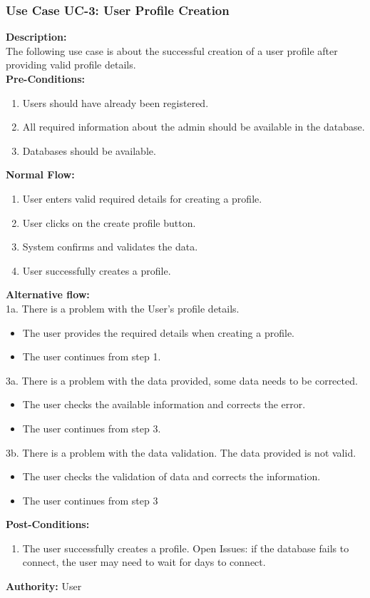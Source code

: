 \subsubsection{Use Case UC-3: User Profile Creation }
\textbf{Description:}\\
The following use case is about the successful creation of a user profile after providing valid profile details. 
\\
\textbf{Pre-Conditions:}
\begin{enumerate}
    \item Users should have already been registered.
    \item  All required information about the admin should be available in the database.
    \item Databases should be available.
\end{enumerate}
\textbf{Normal Flow:}\\
\begin{enumerate}
\item User enters valid required details for creating a profile. 
\item User clicks on the create profile button. 
\item System confirms and validates the data.
\item User successfully creates a profile.
 \end{enumerate}
\textbf{Alternative flow:}  \\
1a. There is a problem with the User’s profile details. 
\begin{itemize}
    \item 	The user provides the required details when creating a profile. 
    \item  The user continues from step 1.
\end{itemize}
3a. There is a problem with the data provided, some data needs to be corrected. 
\begin{itemize}
    \item 	The user checks the available information and corrects the error. 
     \item 	The user continues from step 3. 
\end{itemize}
3b. There is a problem with the data validation. The data provided is not valid.
\begin{itemize}
    \item The user checks the validation of data and corrects the information. 
     \item The user continues from step 3
\end{itemize}	
\textbf{Post-Conditions: }
\begin{enumerate}
\item	The user successfully creates a profile. 
Open Issues: if the database fails to connect, the user may need to wait for days to connect.
\end{enumerate}
\textbf{Authority:}
User
